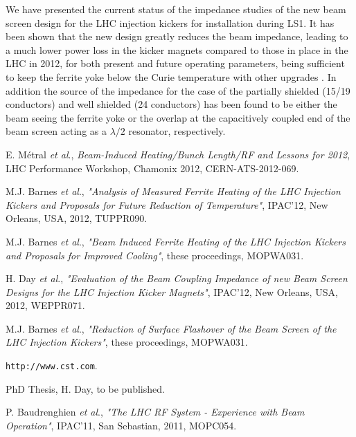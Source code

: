 \documentclass{JAC2003}
\begin{document}
We have presented the current status of the impedance studies of the new beam screen design for the LHC injection kickers for installation during LS1. It has been shown that the new design greatly reduces the beam impedance, leading to a much lower power loss in the kicker magnets compared to those in place in the LHC in 2012, for both present and future operating parameters, being sufficient to keep the ferrite yoke below the Curie temperature with other upgrades \cite{mki-heatingTemp}. In addition the source of the impedance for the case of the partially shielded (15/19 conductors) and well shielded (24 conductors) has been found to be either the beam seeing the ferrite yoke or the overlap at the capacitively coupled end of the beam screen acting as a $\lambda /2 $ resonator, respectively. 

\begin{thebibliography}{9}
E. Métral \emph{et al}., \emph{Beam-Induced Heating/Bunch Length/RF and Lessons for 2012}, LHC Performance Workshop, Chamonix 2012, CERN-ATS-2012-069. 

M.J. Barnes \emph{et al}., \emph{"Analysis of Measured Ferrite Heating of the LHC Injection Kickers and Proposals for Future Reduction of Temperature"}, IPAC'12, New Orleans, USA, 2012, TUPPR090.

M.J. Barnes \emph{et al}., \emph{"Beam Induced Ferrite Heating of the LHC Injection Kickers and Proposals for Improved Cooling"}, these proceedings, MOPWA031.

H. Day \emph{et al}., \emph{"Evaluation of the Beam Coupling Impedance of new Beam Screen Designs for the LHC Injection Kicker Magnets"}, IPAC'12, New Orleans, USA, 2012, WEPPR071.

M.J. Barnes \emph{et al}., \emph{"Reduction of Surface Flashover of the Beam Screen of the LHC Injection Kickers"}, these proceedings, MOPWA031.

\texttt{http://www.cst.com}.

PhD Thesis, H. Day, to be published.

P. Baudrenghien \emph{et al}., \emph{"The LHC RF System - Experience with Beam Operation"}, IPAC'11, San Sebastian, 2011, MOPC054.


\end{thebibliography}
\end{document}
